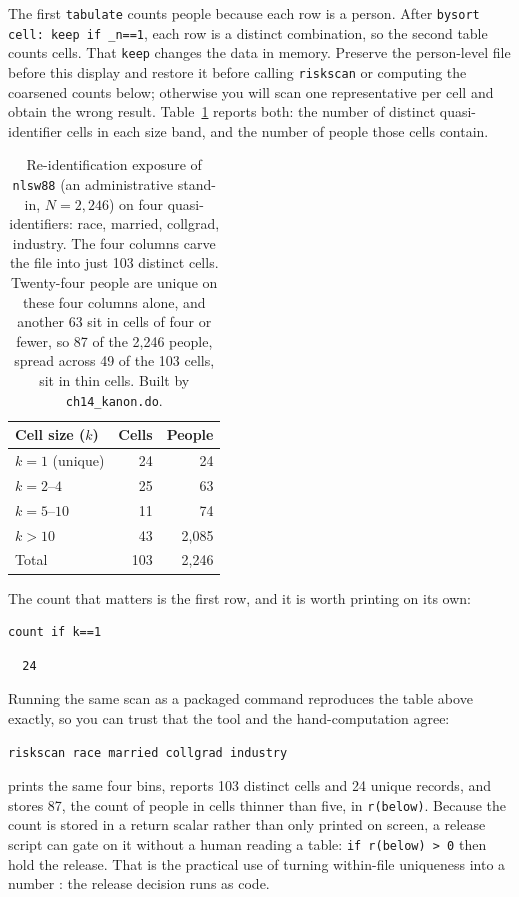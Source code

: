 \documentclass[
    a4paper,
    fontsize=10pt,
    twoside=true,
    numbers=noenddot,
]{kaobook}
\begin{document}
The first \texttt{tabulate} counts people because each row is a person. After \texttt{bysort cell: keep if \_n==1}, each row is a distinct combination, so the second table counts cells. That \texttt{keep} changes the data in memory. Preserve the person-level file before this display and restore it before calling \texttt{riskscan} or computing the coarsened counts below; otherwise you will scan one representative per cell and obtain the wrong result. Table~\ref{tab:kanon} reports both: the number of distinct quasi-identifier cells in each size band, and the number of people those cells contain.

\begin{table}[htbp]
\centering
{\footnotesize
\begin{tabular}{lrr}
\hline
Cell size ($k$) & Cells & People \\
\hline
$k=1$ (unique)   &  24 &    24 \\
$k=2$--$4$        &  25 &    63 \\
$k=5$--$10$       &  11 &    74 \\
$k>10$            &  43 & 2{,}085 \\
\hline
Total            & 103 & 2{,}246 \\
\hline
\end{tabular}
}
\caption[$k$-anonymity of four ordinary columns]{Re-identification exposure of \texttt{nlsw88} (an administrative stand-in, $N=2{,}246$) on four quasi-identifiers: race, married, collgrad, industry. The four columns carve the file into just 103 distinct cells. Twenty-four people are unique on these four columns alone, and another 63 sit in cells of four or fewer, so 87 of the 2{,}246 people, spread across 49 of the 103 cells, sit in thin cells. Built by \texttt{ch14\_kanon.do}.}
\label{tab:kanon}
\end{table}

The count that matters is the first row, and it is worth printing on its own:
\par
{\footnotesize
\begin{verbatim}
count if k==1
\end{verbatim}
}
\par
{\footnotesize
\begin{verbatim}
  24
\end{verbatim}
}
Running the same scan as a packaged command reproduces the table above exactly, so you can trust that the tool and the hand-computation agree:
\par
{\footnotesize
\begin{verbatim}
riskscan race married collgrad industry
\end{verbatim}
}
prints the same four bins, reports 103 distinct cells and 24 unique records, and stores 87, the count of people in cells thinner than five, in \texttt{r(below)}. Because the count is stored in a return scalar rather than only printed on screen, a release script can gate on it without a human reading a table: \texttt{if r(below) > 0} then hold the release. That is the practical use of turning within-file uniqueness into a number \parencite{elemam2008kanon}: the release decision runs as code.
\end{document}
